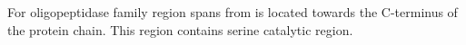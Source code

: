 For \Prolyl oligopeptidase family region spans from is located towards the C-terminus of the protein chain. This region contains serine catalytic region.  